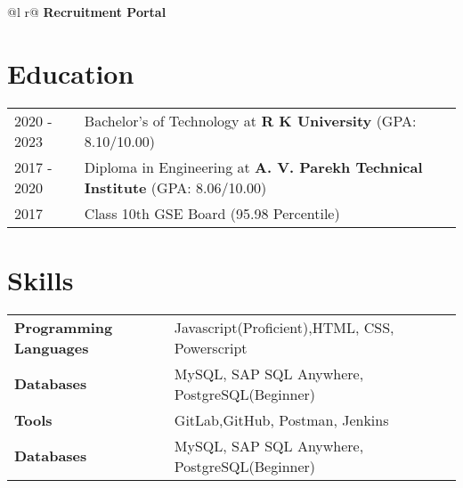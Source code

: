 \documentclass[a4paper,12pt]{article}
\begin{document}
\begin{tabularx}{\linewidth}{ @{}l r@{} }
\textbf{Recruitment Portal}  \\[3.75pt]
\end{tabularx}

\section{Education}
\begin{tabularx}{\linewidth}{@{}l X@{}}	
2020 - 2023 & Bachelor's of Technology at \textbf{R K University} \hfill \normalsize (GPA: 8.10/10.00) \\

2017 - 2020 & Diploma in Engineering at \textbf{A. V. Parekh Technical Institute} \hfill (GPA: 8.06/10.00) \\ 

2017 & Class 10th GSE Board \hfill  (95.98 Percentile) \\

\end{tabularx}

\section{Skills}
\begin{tabularx}{\linewidth}{@{}l X@{}}
\textbf{Programming Languages}  &  \normalsize{Javascript(Proficient),HTML, CSS, Powerscript}\\
\textbf{Databases}  &  \normalsize{MySQL, SAP SQL Anywhere, PostgreSQL(Beginner)}\\  
\textbf{Tools }  &  \normalsize{GitLab,GitHub, Postman, Jenkins}\\
\textbf{Databases}  &  \normalsize{MySQL, SAP SQL Anywhere, PostgreSQL(Beginner)}\\
\end{tabularx}
\end{document}
